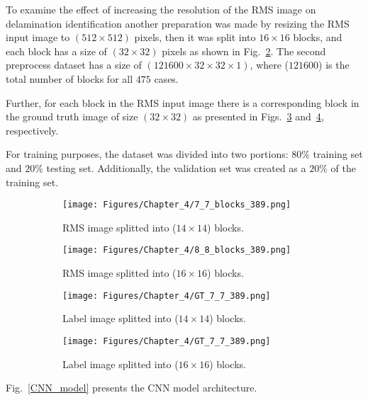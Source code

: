 To examine the effect of increasing the resolution of the RMS image on delamination identification another  preparation was made by resizing the RMS input image to \((512\times 512)\) pixels, then it was split into \(16\times 16\) blocks, and each block has a size of \((32\times 32)\) pixels as shown in Fig.~\ref{fig:RMS_64blocks}.
The second preprocess dataset has a size of \((121600 \times 32 \times 32 \times 1)\), where (\(121600\)) is the total number of blocks for all \(475\) cases.

Further, for each block in the RMS input image there is a corresponding block in the ground truth image of size \((32\times 32)\) as presented in Figs.~\ref{fig:GT_49blocks} and~\ref{fig:GT_64blocks}, respectively.

For training purposes, the dataset was divided into two portions: \(80\%\)	training set and \(20\%\) testing set. 
Additionally, the validation set was created as a \(20\%\) of the training set.
\begin{figure} [h!]
	\centering
	\begin{subfigure}[b]{0.47\textwidth}
		\centering
		\texttt{[image: Figures/Chapter\_4/7\_7\_blocks\_389.png]}
		\caption{RMS image splitted into (\(14\times 14\)) blocks.}
		\label{fig:RMS_49blocks}
	\end{subfigure}
	\hfill
	\begin{subfigure}[b]{0.47\textwidth}
		\centering
		\texttt{[image: Figures/Chapter\_4/8\_8\_blocks\_389.png]}
		\caption{RMS image splitted into (\(16\times 16\)) blocks.}
		\label{fig:RMS_64blocks}
	\end{subfigure}
	\hfill
	\begin{subfigure}[b]{0.47\textwidth}
	\centering
	\texttt{[image: Figures/Chapter\_4/GT\_7\_7\_389.png]}
	\caption{Label image splitted into (\(14\times 14\)) blocks.}
	\label{fig:GT_49blocks}
	\end{subfigure}
	\hfill
	\begin{subfigure}[b]{0.47\textwidth}
		\centering
		\texttt{[image: Figures/Chapter\_4/GT\_7\_7\_389.png]}
		\caption{Label image splitted into (\(16\times 16\)) blocks.}
		\label{fig:GT_64blocks}
	\end{subfigure}
	\caption{}
	\label{fig:grid_mesh}
\end{figure}
		Fig.~\ref{CNN_model} presents the CNN model architecture.
